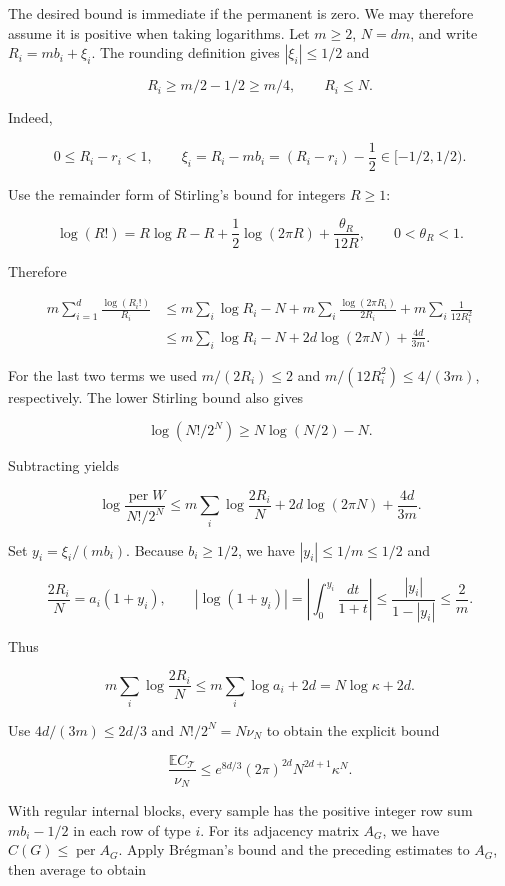 \documentclass[11pt,a4paper]{article}
\begin{document}
The desired bound is immediate if the permanent is zero. We may therefore assume it is positive when taking logarithms. Let \(m\ge2\), \(N=dm\), and write \(R_i=mb_i+\xi_i\). The rounding definition gives \(|\xi_i|\le1/2\) and

\[
R_i\ge m/2-1/2\ge m/4,\qquad R_i\le N.
\]

Indeed,

\[
0\le R_i-r_i<1,\qquad
\xi_i=R_i-mb_i=(R_i-r_i)-\frac12
\in[-1/2,1/2).
\]

Use the remainder form of Stirling's bound for integers \(R\ge1\):

\[
\log(R!)=R\log R-R+\frac12\log(2\pi R)
+\frac{\theta_R}{12R},\qquad 0<\theta_R<1.
\]

Therefore

\[
\begin{aligned}
m\sum_{i=1}^d\frac{\log(R_i!)}{R_i}
&\le m\sum_i\log R_i-N
+m\sum_i\frac{\log(2\pi R_i)}{2R_i}
+m\sum_i\frac1{12R_i^2}\\
&\le m\sum_i\log R_i-N
+2d\log(2\pi N)+\frac{4d}{3m}.
\end{aligned}
\]

For the last two terms we used \(m/(2R_i)\le2\) and \(m/(12R_i^2)\le4/(3m)\), respectively. The lower Stirling bound also gives

\[
\log(N!/2^N)\ge N\log(N/2)-N.
\]

Subtracting yields

\[
\log\frac{\operatorname{per}W}{N!/2^N}
\le m\sum_i\log\frac{2R_i}{N}
+2d\log(2\pi N)+\frac{4d}{3m}.
\]

Set \(y_i=\xi_i/(mb_i)\). Because \(b_i\ge1/2\), we have \(|y_i|\le1/m\le1/2\) and

\[
\frac{2R_i}{N}=a_i(1+y_i),\qquad
|\log(1+y_i)|
=\left|\int_0^{y_i}\frac{dt}{1+t}\right|
\le\frac{|y_i|}{1-|y_i|}\le\frac2m.
\]

Thus

\[
m\sum_i\log\frac{2R_i}{N}
\le m\sum_i\log a_i+2d=N\log\kappa+2d.
\]

Use \(4d/(3m)\le2d/3\) and \(N!/2^N=N\nu_N\) to obtain the explicit bound

\[
\frac{\mathbb EC_{\mathcal T}}{\nu_N}
\le e^{8d/3}(2\pi)^{2d}N^{2d+1}\kappa^N.
\]

With regular internal blocks, every sample has the positive integer row sum \(mb_i-1/2\) in each row of type \(i\). For its adjacency matrix \(A_G\), we have \(C(G)\le\operatorname{per}A_G\). Apply Brégman's bound and the preceding estimates to \(A_G\), then average to obtain
\end{document}

